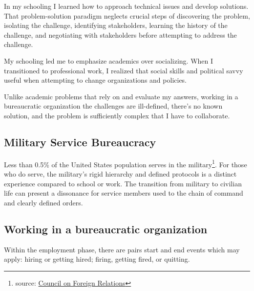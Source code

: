 
In my schooling I learned how to approach technical issues and develop solutions. That problem-solution paradigm neglects crucial steps of discovering the problem, isolating the challenge, identifying stakeholders, learning the history of the challenge, and negotiating with stakeholders before attempting to address the challenge. 

My schooling led me to emphasize academics over socializing. When I transitioned to professional work, I realized that social skills and political savvy useful when attempting to change organizations and policies. 

Unlike academic problems that rely on and evaluate my answers, working in a bureaucratic organization the challenges are ill-defined, there's no known solution, and the problem is sufficiently complex that I have to collaborate.







\subsection{Military Service Bureaucracy\label{bureaucracy-of-military}}
Less than 0.5\% of the United States population serves in the military\footnote{source: \href{https://www.cfr.org/backgrounder/demographics-us-military}{Council on Foreign Relations}}. For those who do serve, the military's rigid hierarchy and defined protocols is a distinct experience compared to school or work. The transition from military to civilian life can present a dissonance for service members used to the chain of command and clearly defined orders. 

\subsection{Working in a bureaucratic organization\label{sec:bureaucracy-of-work}}
Within the employment phase, there are pairs start and end events which may apply: hiring or getting hired; firing, getting fired, or quitting. 

